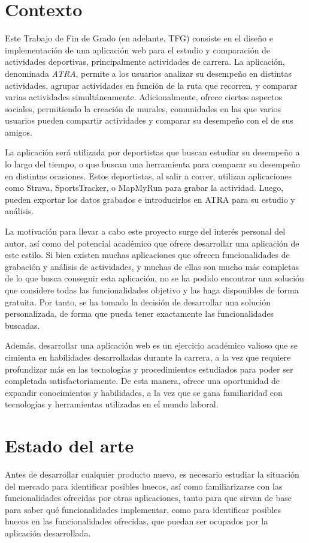 \section{Contexto}
Este Trabajo de Fin de Grado (en adelante, TFG) consiste en el diseño e implementación de una aplicación web para el estudio y comparación de actividades deportivas, principalmente actividades de carrera. La aplicación, denominada \textit{ATRA}, permite a los usuarios analizar su desempeño en distintas actividades, agrupar actividades en función de la ruta que recorren, y comparar varias actividades simultáneamente.  Adicionalmente, ofrece ciertos aspectos sociales, permitiendo la creación de murales, comunidades en las que varios usuarios pueden compartir actividades y comparar su desempeño con el de sus amigos.

La aplicación será utilizada por deportistas que buscan estudiar su desempeño a lo largo del tiempo, o que buscan una herramienta para comparar su desempeño en distintas ocasiones. Estos deportistas, al salir a correr, utilizan aplicaciones como Strava, SportsTracker,  o MapMyRun para grabar la actividad. Luego, pueden exportar los datos grabados e introducirlos en ATRA para su estudio y análisis.

La motivación para llevar a cabo este proyecto surge del interés personal del autor, así como del potencial académico que ofrece desarrollar una aplicación de este estilo. Si bien existen muchas aplicaciones que ofrecen funcionalidades de grabación y análisis de actividades, y muchas de ellas son mucho más completas de lo que busca conseguir esta aplicación, no se ha podido encontrar una solución que considere todas las funcionalidades objetivo y las haga disponibles de forma gratuita. Por tanto, se ha tomado la decisión de desarrollar una solución personalizada, de forma que pueda tener exactamente las funcionalidades buscadas. 

Además, desarrollar una aplicación web es un ejercicio académico valioso que se cimienta en habilidades desarrolladas durante la carrera, a la vez que requiere profundizar más en las tecnologías y procedimientos estudiados para poder ser completada satisfactoriamente. De esta manera, ofrece una oportunidad de expandir conocimientos y habilidades, a la vez que se gana familiaridad con tecnologías y herramientas utilizadas en el mundo laboral.


\section{Estado del arte}
Antes de desarrollar cualquier producto nuevo, es necesario estudiar la situación del mercado para identificar posibles huecos, así como familiarizarse con las funcionalidades ofrecidas por otras aplicaciones, tanto para que sirvan de base para saber qué funcionalidades implementar, como para identificar posibles huecos en las funcionalidades ofrecidas, que puedan ser ocupados por la aplicación desarrollada.


